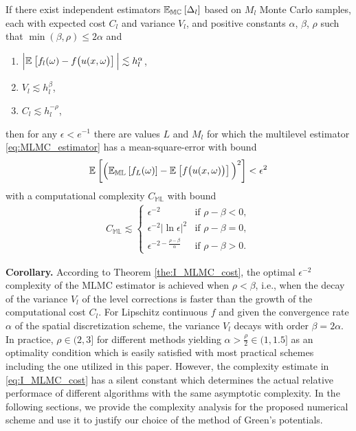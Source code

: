 \begin{Theorem}\label{the:I_MLMC_cost}
If there exist independent estimators $\mathbb{E_{MC}}_{{}} \left[ {\Delta_{l}} \right]$ based on $M_l$ Monte Carlo samples, each with expected cost $C_l$ and variance $V_l$, and positive constants $\alpha$, $\beta$, $\rho$ such that $\min(\beta, \rho) \leq 2\alpha$ and
\begin{enumerate}
	\item $\Big| \mathbb{E}_{{}} \left[ {f_l(\omega) - f \big( u(x,\omega \big)} \right] \Big| \lesssim h_l^{\alpha}$,
	\item $V_l \lesssim h_l^{\beta}$,
	\item $C_l \lesssim h_l^{-\rho}$,
\end{enumerate}
then for any $\epsilon < e^{-1}$ there are values $L$ and $M_l$ for which the multilevel estimator \eqref{eq:MLMC_estimator} has a mean-square-error with bound 
\begin{align*}
	\mathbb{E}_{{}} \left[ { \Big( \mathbb{E_{ML}}_{{}} \left[ {f_L(\omega)} \right] - \mathbb{E}_{{}} \left[ {f\big(u(x,\omega)\big)} \right] \Big)^2 } \right]
	< \epsilon^2
\end{align*}
with a computational complexity $C_{\mathbb{ML}}$ with bound
	\begin{align}\label{eq:I_MLMC_cost}
		C_{\mathbb{ML}}
		\lesssim 
		\begin{cases}
			\epsilon^{-2}  & \text{if } \rho - \beta < 0, \\
			\epsilon^{-2} \big| \ln \epsilon \big|^2  & \text{if } \rho - \beta = 0, \\
			\epsilon^{-2-\frac{\rho-\beta}{\alpha}} & \text{if } \rho - \beta > 0.
		\end{cases}
	\end{align}
\end{Theorem}

\textbf{Corollary.}
According to Theorem \ref{the:I_MLMC_cost}, the optimal $\epsilon^{-2}$ complexity of the MLMC estimator is achieved when $\rho<\beta$, i.e., when the decay of the variance $V_l$ of the level corrections is faster than the growth of the computational cost $C_l$.
For Lipschitz continuous $f$ and given the convergence rate $\alpha$ of the spatial discretization scheme, the variance $V_l$ decays with order $\beta=2\alpha$.
In practice, $\rho\in(2,3]$ for different methods yielding $\alpha>\frac{\rho}{2}\in (1,1.5]$ as an optimality condition which is easily satisfied with most practical schemes including the one utilized in this paper.
However, the complexity estimate in \eqref{eq:I_MLMC_cost} has a silent constant which determines the actual relative performace of different algorithms with the same asymptotic complexity.
In the following sections, we provide the complexity analysis for the proposed numerical scheme and use it to justify our choice of the method of Green's potentials.



